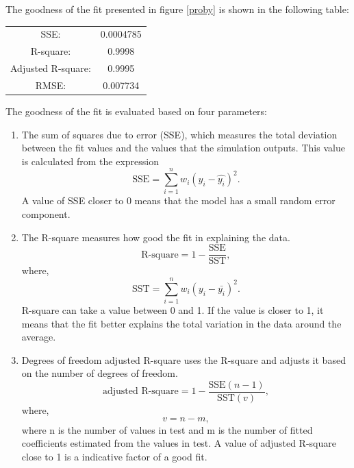 The goodness of the fit presented in figure \ref{proby} is shown in the following table:
\begin{table}[H]
\centering
\label{tab:goodnessfitprob0}
    \begin{tabular}{c|c}
        SSE:                &0.0004785\\
        R-square:           &0.9998\\
        Adjusted R-square:  &0.9995\\
        RMSE:               &0.007734
  \end{tabular}
\end{table}

The goodness of the fit is evaluated based on four parameters:
\begin{enumerate}
  \item The sum of squares due to error (SSE), which measures the total deviation between the fit values and the values that the simulation outputs. This value is calculated from the expression 
      \begin{equation}\label{}
        \textrm{SSE} = \sum_{i=1}^{n} w_i(y_{i}-\hat{y_{i}})^2.
        \nonumber
      \end{equation}
      A value of SSE closer to 0 means that the model has a small random error component.
      
  \item The R-square measures how good the fit in explaining the data. 
    \begin{equation}\label{}
    \textrm{R-square} = 1-\frac{\textrm{SSE}}{\textrm{SST}},
    \nonumber
    \end{equation}
    where,
    \begin{equation}\label{}
    \textrm{SST} = \sum_{i=1}^{n} w_i (y_i - \bar{y_i})^2.
      \nonumber
    \end{equation} 
    R-square can take a value between 0 and 1. If the value is closer to 1, it means that the fit better explains the total variation in the data around the average.
  
  \item Degrees of freedom adjusted R-square uses the R-square and adjusts it based on the number of degrees of freedom. 
    \begin{equation}\label{}
      \textrm{adjusted R-square} = 1 - \frac{\textrm{SSE}(n-1)}{\textrm{SST}(v)},
      \nonumber
    \end{equation} 
    where,
    \begin{equation}\label{}
      v = n - m,
      \nonumber
    \end{equation}
    where n is the number of values in test and m is the number of fitted coefficients estimated from the values in test. A value of adjusted R-square close to 1 is a indicative factor of a good fit.
    

\end{enumerate}
